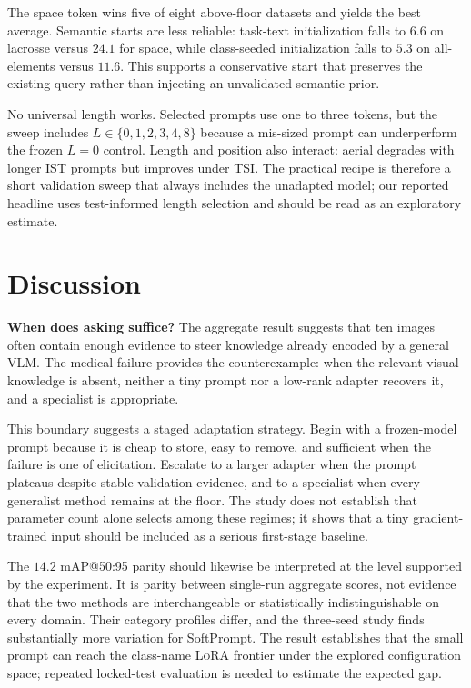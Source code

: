 \documentclass{article}
\newcommand{\lora}{\textsc{LoRA}}
\begin{document}
The space token wins five of eight above-floor datasets and yields the best
average.
Semantic starts are less reliable: task-text initialization falls to $6.6$ on
lacrosse versus $24.1$ for space, while class-seeded initialization falls to
$5.3$ on all-elements versus $11.6$.
This supports a conservative start that preserves the existing query rather
than injecting an unvalidated semantic prior.

No universal length works.
Selected prompts use one to three tokens, but the sweep includes
$L\in\{0,1,2,3,4,8\}$ because a mis-sized prompt can underperform the frozen
$L=0$ control.
Length and position also interact: aerial degrades with longer IST prompts but
improves under TSI.
The practical recipe is therefore a short validation sweep that always
includes the unadapted model; our reported headline uses test-informed length
selection and should be read as an exploratory estimate.

\section{Discussion}
\label{sec:discussion}

\textbf{When does asking suffice?}
The aggregate result suggests that ten images often contain enough evidence to
steer knowledge already encoded by a general VLM.
The medical failure provides the counterexample: when the relevant visual
knowledge is absent, neither a tiny prompt nor a low-rank adapter recovers it,
and a specialist is appropriate.

This boundary suggests a staged adaptation strategy. Begin with a frozen-model
prompt because it is cheap to store, easy to remove, and sufficient when the
failure is one of elicitation. Escalate to a larger adapter when the prompt
plateaus despite stable validation evidence, and to a specialist when every
generalist method remains at the floor. The study does not establish that
parameter count alone selects among these regimes; it shows that a tiny
gradient-trained input should be included as a serious first-stage baseline.

The $14.2$ mAP@50:95 parity should likewise be interpreted at the level
supported by the experiment. It is parity between single-run aggregate scores, not evidence
that the two methods are interchangeable or statistically indistinguishable
on every domain. Their category profiles differ, and the three-seed study finds
substantially more variation for SoftPrompt. The result establishes that the
small prompt can reach the class-name \lora{} frontier under the explored
configuration space; repeated locked-test evaluation is needed to estimate the
expected gap.
\end{document}
